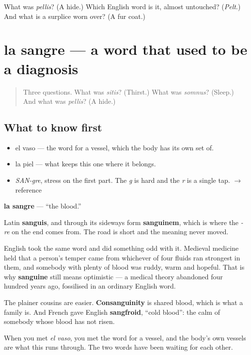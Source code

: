 \begin{tcolorbox}[breakable,colback=teal!4,colframe=teal!35!black,title={Before you move on}]
What was \emph{pellis}? (A hide.) Which English word is it, almost untouched? (\emph{Pelt}.) And what is a surplice worn over? (A fur coat.)
\end{tcolorbox}
\section[la sangre]{la sangre — a word that used to be a diagnosis}

\label{lesson:ES-C300-sangre}



\begin{quote}
Three questions. What was \emph{sitis}? (Thirst.) What was \emph{somnus}? (Sleep.) And what was \emph{pellis}? (A hide.)
\end{quote}

\subsection*{What to know first}
\begin{itemize}
\raggedright
  \item el vaso — the word for a vessel, which the body has its own set of.
  \item la piel — what keeps this one where it belongs.
\end{itemize}

\begin{sounds}
\begin{itemize}
\raggedright
  \item \emph{SAN-gre}, stress on the first part. The \emph{g} is hard and the \emph{r} is a single tap. $\to$ reference
\end{itemize}
\end{sounds}

\begin{cousinweb}
\textbf{la sangre} — \textquotedblleft{}the blood.\textquotedblright{}

Latin \textbf{sanguis}, and through its sideways form \textbf{sanguinem}, which is where the \emph{-re} on the end comes from. The road is short and the meaning never moved.

English took the same word and did something odd with it. Medieval medicine held that a person's temper came from whichever of four fluids ran strongest in them, and somebody with plenty of blood was ruddy, warm and hopeful. That is why \textbf{sanguine} still means optimistic — a medical theory abandoned four hundred years ago, fossilised in an ordinary English word.

The plainer cousins are easier. \textbf{Consanguinity} is shared blood, which is what a family is. And French gave English \textbf{sangfroid}, \textquotedblleft{}cold blood\textquotedblright{}: the calm of somebody whose blood has not risen.

When you met \emph{el vaso}, you met the word for a vessel, and the body's own vessels are what this runs through. The two words have been waiting for each other.
\end{cousinweb}

